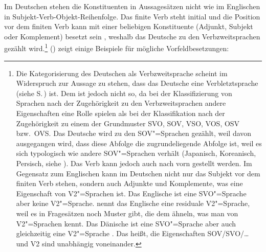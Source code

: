 \largerpage
Im Deutschen stehen die Konstituenten in
Aussagesätzen nicht wie im Englischen in Subjekt-Verb-Objekt-Reihenfolge. Das finite Verb steht
initial und die Position vor dem finiten Verb kann mit einer beliebigen Konstituente (Adjunkt, Subjekt oder Komplement) besetzt sein \parencites[Abschnitt~2.4]{Erdmann1886a}[, ]{Paul1919a}, weshalb das Deutsche zu den Verbzweitsprachen gezählt wird.\footnote{%
  Die Kategorisierung des Deutschen als Verbzweitsprache scheint im Widerspruch zur Aussage zu stehen, 
  dass das Deutsche eine Verbletztsprache (siehe S.\,\pageref{page-verbletzt}) ist. Dem ist
  jedoch nicht so, da bei der Klassifizierung von Sprachen nach der Zugehörigkeit zu den Verbzweitsprachen
  andere Eigenschaften eine Rolle spielen als bei der Klassifikation nach der Zugehörigkeit zu einem
  der Grundmuster SVO, SOV, VSO, VOS, OSV bzw.\ OVS. Das Deutsche wird zu den SOV"=Sprachen gezählt,
  weil davon ausgegangen wird, dass diese Abfolge die zugrundeliegende Abfolge ist, weil es sich
  typologisch wie andere SOV"=Sprachen verhält (Japanisch, Koreanisch, Persisch, siehe
  \citealt{Haider2020a}). Das Verb kann jedoch auch nach vorn gestellt werden. Im Gegensatz zum
  Englischen kann im Deutschen nicht nur das Subjekt vor dem finiten Verb stehen, sondern auch
  Adjunkte und Komplemente, was eine Eigenschaft von V2"=Sprachen ist. Das Englische ist eine
  SVO"=Sprache aber keine V2"=Sprache. \citet[]{Rizzi1990a-u} nennt das Englische eine
  residuale V2"=Sprache, weil es in Fragesätzen noch Muster gibt, die dem ähneln, was man von
  V2"=Sprachen kennt. Das Dänische ist eine SVO"=Sprache aber auch gleichzeitig eine V2"=Sprache
  \citep{Vikner95a-u,MOeDanish,MuellerGermanic}. Das heißt, die Eigenschaften SOV/SVO/\ldots{} und V2 sind
  unabhängig voneinander.%
}%
() zeigt einige Beispiele für mögliche Vorfeldbesetzungen:
\ea
\label{fragen}
